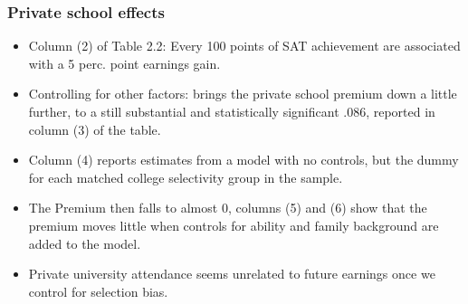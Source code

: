 \documentclass{beamer}
\begin{document}
\begin{frame}
\frametitle{Private school effects}
\begin{itemize}
	\item Column (2) of Table 2.2: Every 100 points of SAT achievement are associated with a 5 perc. point earnings gain.
	\item Controlling for other factors: brings the private school premium down a little further, to a still substantial and statistically significant .086, reported in column (3) of the table.
	\item Column (4) reports estimates from a model with no controls, but the dummy for each matched college selectivity group in the sample.
	\item The Premium then falls to almost 0, columns (5) and (6) show that the premium moves little when controls for ability and family background are added to the model.
	\item Private university attendance seems unrelated to future earnings once we control for selection bias.
\end{itemize}
\end{frame}

\end{document}
